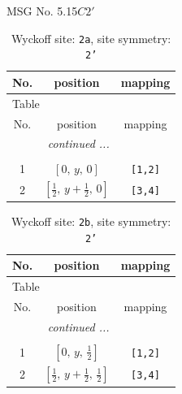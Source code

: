 \documentclass[fleqn,8pt]{jsarticle}
\begin{document}
\setcounter{MaxMatrixCols}{32}

\renewcommand{\tablename}{Table~}
\renewcommand{\figurename}{Figure~}
\begin{center}
\LARGE
MSG No. 5.15\quad$C2'$
\end{center}
\renewcommand{\arraystretch}{1.2}
\begin{longtable}{ccc}
\caption{Wyckoff site: {\tt 2a}, site symmetry: {\tt 2'}}
 \\
 \hline \hline
No. & position & mapping \\ \hline \endfirsthead

\multicolumn{2}{l}{\tablename\ \thetable{}} \\
 \hline \hline
No. & position & mapping \\ \hline \endhead

 \hline \hline
\multicolumn{2}{r}{\footnotesize\it continued ...} \\ \endfoot

 \hline \hline
\multicolumn{2}{r}{} \\ \endlastfoot

1 & $\left[ 0,\, y,\, 0 \right]$ & {\tt [1,2]} \\ \hline
2 & $\left[ \frac{1}{2},\, y + \frac{1}{2},\, 0 \right]$ & {\tt [3,4]} \\
\end{longtable}
\renewcommand{\arraystretch}{1.2}
\begin{longtable}{ccc}
\caption{Wyckoff site: {\tt 2b}, site symmetry: {\tt 2'}}
 \\
 \hline \hline
No. & position & mapping \\ \hline \endfirsthead

\multicolumn{2}{l}{\tablename\ \thetable{}} \\
 \hline \hline
No. & position & mapping \\ \hline \endhead

 \hline \hline
\multicolumn{2}{r}{\footnotesize\it continued ...} \\ \endfoot

 \hline \hline
\multicolumn{2}{r}{} \\ \endlastfoot

1 & $\left[ 0,\, y,\, \frac{1}{2} \right]$ & {\tt [1,2]} \\ \hline
2 & $\left[ \frac{1}{2},\, y + \frac{1}{2},\, \frac{1}{2} \right]$ & {\tt [3,4]} \\
\end{longtable}
\renewcommand{\arraystretch}{1.2}
\end{document}
